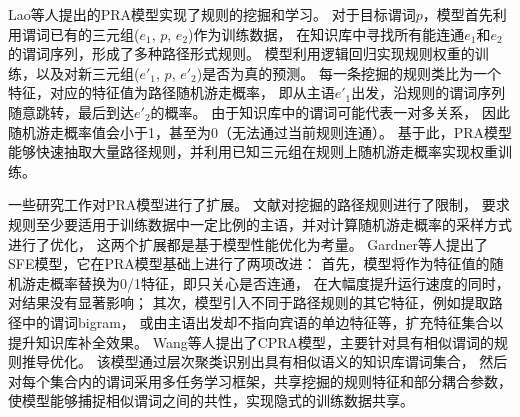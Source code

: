 Lao等人提出的PRA模型\cite{lao2010fast}实现了规则的挖掘和学习。
对于目标谓词$p$，模型首先利用谓词已有的三元组($e_1$, $p$, $e_2$)作为训练数据，
在知识库中寻找所有能连通$e_1$和$e_2$的谓词序列，形成了多种路径形式规则。
模型利用逻辑回归实现规则权重的训练，以及对新三元组($e'_1$, $p$, $e'_2$)是否为真的预测。
每一条挖掘的规则类比为一个特征，对应的特征值为路径随机游走概率，
即从主语$e'_1$出发，沿规则的谓词序列随意跳转，最后到达$e'_2$的概率。
由于知识库中的谓词可能代表一对多关系，
因此随机游走概率值会小于1，甚至为0（无法通过当前规则连通）。
基于此，PRA模型能够快速抽取大量路径规则，并利用已知三元组在规则上随机游走概率实现权重训练。

一些研究工作对PRA模型进行了扩展。
文献\parencite{lao2011random}对挖掘的路径规则进行了限制，
要求规则至少要适用于训练数据中一定比例的主语，并对计算随机游走概率的采样方式进行了优化，
这两个扩展都是基于模型性能优化为考量。
Gardner等人提出了SFE模型\cite{gardner2015efficient}，它在PRA模型基础上进行了两项改进：
首先，模型将作为特征值的随机游走概率替换为0/1特征，即只关心是否连通，
在大幅度提升运行速度的同时，对结果没有显著影响；
其次，模型引入不同于路径规则的其它特征，例如提取路径中的谓词bigram，
或由主语出发却不指向宾语的单边特征等，扩充特征集合以提升知识库补全效果。
Wang等人提出了CPRA模型\cite{wang2016knowledge}，主要针对具有相似谓词的规则推导优化。
该模型通过层次聚类识别出具有相似语义的知识库谓词集合，
然后对每个集合内的谓词采用多任务学习框架，共享挖掘的规则特征和部分耦合参数，
使模型能够捕捉相似谓词之间的共性，实现隐式的训练数据共享。

% 
% 
% 
% 
%     
% 
% 
% 

